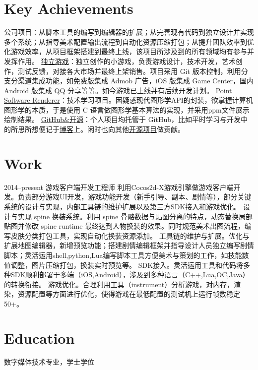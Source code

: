 \documentclass[full]{rvca}
\begin{document}
\section{Key Achievements}

\achievements
{公司项目：从脚本工具的编写到编辑器的扩展；从完善现有代码到独立设计并实现多个系统；从指导美术配置输出流程到自动化资源压缩打包；从提升团队效率到优化游戏效率，从项目框架搭建到最终上线，该项目所涉及到的所有领域均有参与并发挥作用。}
{\href{http://a.app.qq.com/o/simple.jsp?pkgname=com.kode.Thirteen}{独立游戏}：独立创作的小游戏，负责游戏设计，技术开发，艺术创作，测试反馈，对接各大市场并最终上架销售。项目采用 Git 版本控制，利用分支分渠道集成功能，如免费版集成 Admob 广告，iOS 版集成 Game Center，国内 Android 版集成 QQ 分享等等。如今游戏已上线并有后续开发计划。}
{\href{https://github.com/keyring/point}{Point Software Renderer}：技术学习项目。因疑惑现代图形学API的封装，欲掌握计算机图形学的本质，于是使用 C 语言做图形学基本算法的实现，并采用ppm文件展示绘制结果。}
{\href{http://github.com/keyring}{GitHub\&开源}：个人项目均托管于 GitHub，比如平时学习与开发中的所思所想便记于\href{http://www.photoneray.com}{博客}上。闲时也向其他\href{https://github.com/cloudwu/lua53doc/graphs/contributors}{开源项目}做贡献。}
{}

\section{Work}


{2014--present}%
{游戏客户端开发工程师} %
{利用Cocos2d-X游戏引擎做游戏客户端开发。负责部分游戏UI开发，游戏功能开发（新手引导、副本、剧情等），部分关键系统的设计与实现，内部工具链的维护扩展以及第三方SDK接入和游戏优化。}%
{设计与实现 spine 换装系统。利用 spine 骨骼数据与贴图分离的特点，动态替换局部贴图并修改 spine runtime 最终达到人物换装的效果。同时规范美术出图流程，编写皮肤分类打包工具，实现自动化换装资源添加。}
{工具链的维护与扩展。优化与扩展地图编辑器，新增预览功能；搭建剧情编辑框架并指导设计人员独立编写剧情脚本；灵活运用shell,python,Lua编写脚本工具方便美术与策划的工作，如技能数值调整，图片压缩打包，换装实时预览等。}
{SDK接入。灵活运用工具和代码将多种SDK顺利部署于多端（iOS,Android），涉及到多种语言（C++,Lua,OC,Java）的转换衔接。}
{游戏优化。合理利用工具（instrument）分析游戏，对内存，渲染，资源配置等方面进行优化，使得游戏在最低配置的测试机上运行帧数稳定50+。}
{}

\section{Education}

数字媒体技术专业，学士学位
\end{document}
